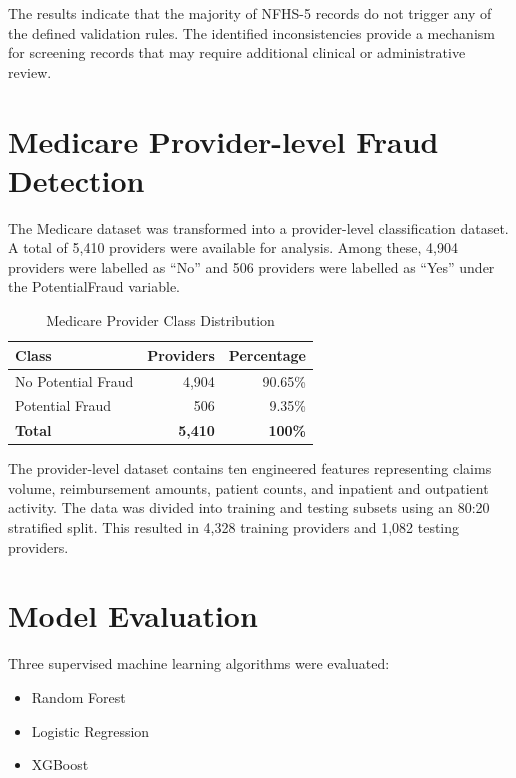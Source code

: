 The results indicate that the majority of NFHS-5 records do not trigger any of the defined validation rules. The identified inconsistencies provide a mechanism for screening records that may require additional clinical or administrative review.

\section{Medicare Provider-level Fraud Detection}

The Medicare dataset was transformed into a provider-level classification dataset. A total of 5,410 providers were available for analysis. Among these, 4,904 providers were labelled as ``No'' and 506 providers were labelled as ``Yes'' under the PotentialFraud variable.

\begin{table}[h!]
\centering
\begin{tabular}{|l|r|r|}
\hline
\textbf{Class} & \textbf{Providers} & \textbf{Percentage} \\
\hline
No Potential Fraud & 4,904 & 90.65\% \\
\hline
Potential Fraud & 506 & 9.35\% \\
\hline
\textbf{Total} & \textbf{5,410} & \textbf{100\%} \\
\hline
\end{tabular}
\caption{Medicare Provider Class Distribution}
\label{tab:medicare-class}
\end{table}

The provider-level dataset contains ten engineered features representing claims volume, reimbursement amounts, patient counts, and inpatient and outpatient activity. The data was divided into training and testing subsets using an 80:20 stratified split. This resulted in 4,328 training providers and 1,082 testing providers.

\section{Model Evaluation}

Three supervised machine learning algorithms were evaluated:

\begin{itemize}
\item Random Forest
\item Logistic Regression
\item XGBoost
\end{itemize}


